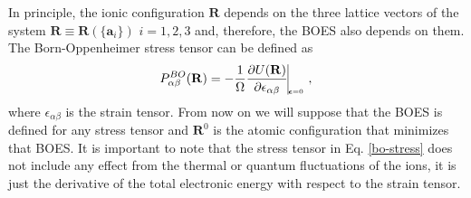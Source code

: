 In principle, the ionic configuration $\mathbf{R}$ depends on the three lattice vectors of the system $\mathbf{R}\equiv\mathbf{R}(\{\mathbf{a}_{i}\})$ $i=1,2,3$ and, therefore, the BOES also depends on them. The Born-Oppenheimer stress 
tensor can be defined as
\begin{equation}
\label{bo-stress}
 P_{\alpha\beta}^{BO}(\mathbf{R})=-\frac{1}{\Omega}\frac{\partial U(\mathbf{R})}{\partial\epsilon_{\alpha\beta}}\vline_{_{_{_{_{_{_{_{\boldsymbol{\epsilon}=0}}}}}}}},
\end{equation} 
where $\epsilon_{\alpha\beta}$ is the strain tensor. From now on we will suppose that the BOES is defined for any stress tensor and $\mathbf{R}^{0}$ is the atomic configuration that minimizes that BOES. It is important to note 
that the stress tensor in Eq. \ref{bo-stress} does not include any effect from the thermal or quantum fluctuations of the ions, it is just the derivative of the total electronic energy with respect to the strain tensor. \\
 

